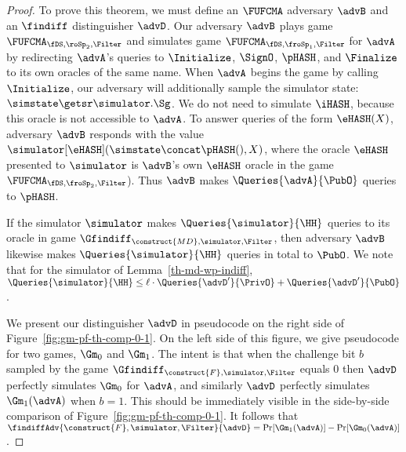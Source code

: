 \begin{proof}
	To prove this theorem, we must define an $\FUFCMA$ adversary $\advB$ and an $\findiff$ distinguisher $\advD$. 
	Our adversary $\advB$ plays game $\FUFCMA_{\fDS,\roSp_2, \Filter}$ and simulates game $\FUFCMA_{\fDS, \froSp_1,\Filter}$ for $\advA$ by redirecting $\advA$'s queries to $\Initialize$, $\SignO$, $\pHASH$, and $\Finalize$ to its own oracles of the same name. 
	When $\advA$ begins the game by calling $\Initialize$, our adversary will additionally sample the simulator state: $\simstate \getsr \simulator.\Sg$. 
	We do not need to simulate $\iHASH$, because this oracle is not accessible to $\advA$.
	To answer queries of the form $\eHASH(X)$, adversary $\advB$ responds with the value $\simulator[\eHASH](\simstate \concat \pHASH(), X)$, where the oracle $\eHASH$ presented to $\simulator$ is $\advB$'s own $\eHASH$ oracle in the game $\FUFCMA_{\fDS,\froSp_2,\Filter}$).
	Thus $\advB$ makes $\Queries{\advA}{\PubO}$ queries to $\pHASH$. 
	
	If the simulator $\simulator$ makes $\Queries{\simulator}{\HH}$ queries to its oracle in game $\Gfindiff_{\construct{MD},  \simulator, \Filter}$, then adversary $\advB$ likewise makes $\Queries{\simulator}{\HH}$ queries in total to $\PubO$.
	We note that for the simulator of Lemma~\ref{th-md-wp-indiff},$\Queries{\simulator}{\HH} \leq \ell \cdot \Queries{\advD^{\prime}}{\PrivO} + \Queries{\advD^{\prime}}{\PubO}$.  
	
	We present our distinguisher $\advD$ in pseudocode on the right side of Figure~\ref{fig:gm-pf-th-comp-0-1}. 
	On the left side of this figure, we give pseudocode for two games, $\Gm_0$ and $\Gm_1$. 
	The intent is that when the challenge bit $b$ sampled by the game $\Gfindiff_{\construct{F},  \simulator, \Filter}$ equals $0$ then $\advD$ perfectly simulates $\Gm_0$ for $\advA$, and similarly $\advD$ perfectly simulates $\Gm_1(\advA)$ when $b=1$.
	 This should be immediately visible in the side-by-side comparison of Figure~\ref{fig:gm-pf-th-comp-0-1}.
	 It follows that $\findiffAdv{\construct{F},\simulator,\Filter}{\advD} = \Pr[\Gm_1(\advA)] - \Pr[\Gm_0(\advA)]$.
	 

\end{proof}
